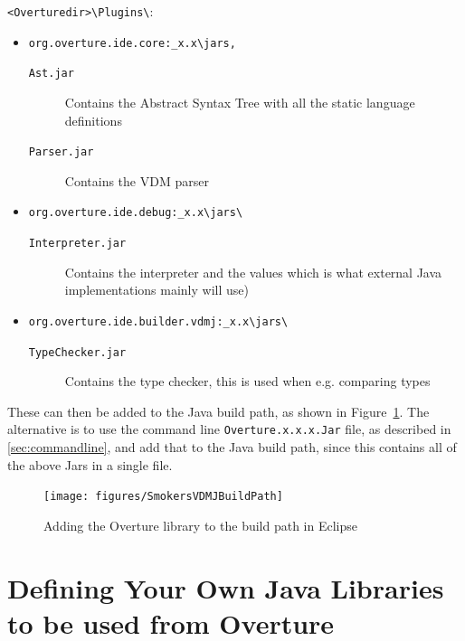 \documentclass{overturerepchap}
\begin{document}
 \texttt{\textless  Overturedir\textgreater\textbackslash Plugins\textbackslash }:

\begin{itemize}
\item \texttt{org.overture.ide.core:\_x.x\textbackslash jars,} 

\begin{description}
\item[\texttt{Ast.jar}] Contains the Abstract Syntax Tree with all the static language definitions
\item[\texttt{Parser.jar}] Contains the VDM parser
\end{description}

\item \texttt{org.overture.ide.debug:\_x.x\textbackslash jars\textbackslash}

\begin{description}
\item[\texttt{Interpreter.jar}] Contains the interpreter and the values which is what external Java implementations mainly will use)
\end{description}

\item \texttt{org.overture.ide.builder.vdmj:\_x.x\textbackslash jars\textbackslash}

\begin{description}
\item[\texttt{TypeChecker.jar}] Contains the type checker, this is used when e.g. comparing types
\end{description}

\end{itemize}

\noindent These can then be added to the Java build path, as shown in Figure~\ref{fig:gui:VDMJBuildPath}. The alternative is to use the command line \texttt{Overture.x.x.x.Jar} file, as described in \autoref{sec:commandline}, and add that to the Java build path, since this contains all of the above Jars in a single file.

\begin{figure}[h]
\begin{center}
  \texttt{[image: figures/SmokersVDMJBuildPath]}
  \caption[labelInTOC]{Adding the Overture library to the build path in Eclipse}
  \label{fig:gui:VDMJBuildPath}
\end{center}
\end{figure}

\section{Defining Your Own Java Libraries to be used from Overture}\label{sec:javalibs}
\end{document}
